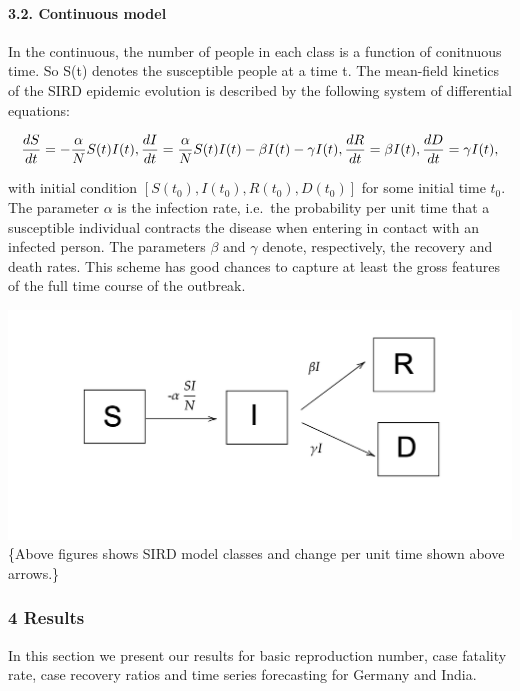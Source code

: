 \documentclass[]{article}
\let\oldparagraph\paragraph
\renewcommand{\paragraph}[1]{\oldparagraph{#1}\mbox{}}
\begin{document}
\hypertarget{continuous-model}{%
\paragraph{3.2. Continuous model}\label{continuous-model}}

In the continuous, the number of people in each class is a function of
conitnuous time. So S(t) denotes the susceptible people at a time t. The
mean-field kinetics of the SIRD epidemic evolution is described by the
following system of differential equations:

\[
\frac{dS}{dt} = -\frac{\alpha}{N} S(t)I(t), \\
\frac{dI}{dt} = \frac{\alpha}{N} S(t)I(t) - \beta I(t) - \gamma I(t), \\
\frac{dR}{dt} = \beta I(t), \\
\frac{dD}{dt} = \gamma I(t) ,
\]

with initial condition \([S(t_{0}),I(t_{0}),R(t_{0}),D(t_{0})]\) for
some initial time \(t_{0}\). The parameter \(\alpha\) is the infection
rate, i.e.~the probability per unit time that a susceptible individual
contracts the disease when entering in contact with an infected person.
The parameters \(\beta\) and \(\gamma\) denote, respectively, the
recovery and death rates. This scheme has good chances to capture at
least the gross features of the full time course of the outbreak.

\includegraphics{SIRD.png}\{Above figures shows SIRD model classes and
change per unit time shown above arrows.\}

\hypertarget{results}{%
\subsubsection{4 Results}\label{results}}

In this section we present our results for basic reproduction number,
case fatality rate, case recovery ratios and time series forecasting for
Germany and India.
\end{document}
